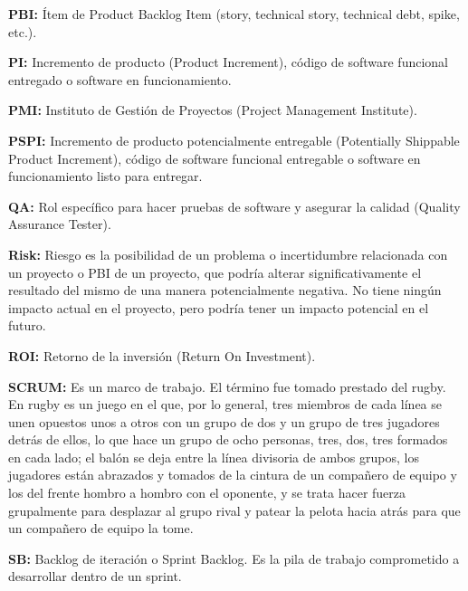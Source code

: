 \begin{description}
  \item {\textbf{PBI:} Ítem de Product Backlog Item (story, technical story, technical debt, spike, etc.).}
  
  \item {\textbf{PI:} Incremento de producto (Product Increment), código de software funcional entregado o software en funcionamiento.}
  
  \item {\textbf{PMI:} Instituto de Gestión de Proyectos (Project Management Institute).}
  
  \item {\textbf{PSPI:} Incremento de producto potencialmente entregable (Potentially Shippable Product Increment), código de software funcional entregable o software en funcionamiento listo para entregar.}
  
  \item {\textbf{QA:} Rol específico para hacer pruebas de software y asegurar la calidad (Quality Assurance Tester).}
  
  \item {\textbf{Risk:} Riesgo es la posibilidad de un problema o incertidumbre relacionada con un proyecto o PBI de un proyecto, que podría alterar significativamente el resultado del mismo de una manera potencialmente negativa. No tiene ningún impacto actual en el proyecto, pero podría tener un impacto potencial en el futuro.}
  
  \item {\textbf{ROI:} Retorno de la inversión (Return On Investment).}
  
  \item {\textbf{SCRUM:} Es un marco de trabajo. El término fue tomado prestado del rugby. En rugby es un juego en el que, por lo general, tres miembros de cada línea se unen opuestos unos a otros con un grupo de dos y un grupo de tres jugadores detrás de ellos, lo que hace un grupo de ocho personas, tres, dos, tres formados en cada lado; el balón se deja entre la línea divisoria de ambos grupos, los jugadores están abrazados y tomados de la cintura de un compañero de equipo y los del frente hombro a hombro con el oponente, y se trata hacer fuerza grupalmente para desplazar al grupo rival y patear la pelota hacia atrás para que un compañero de equipo la tome.}
  
  \item {\textbf{SB:} Backlog de iteración o Sprint Backlog. Es la pila de trabajo comprometido a desarrollar dentro de un sprint.}
  

\end{description}
